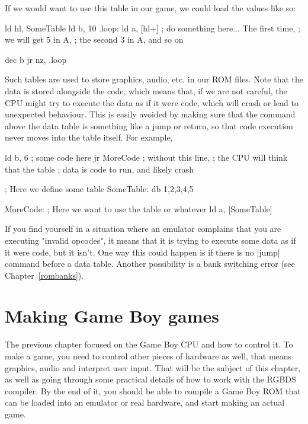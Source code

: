 \documentclass[11pt]{book}
\begin{document}
If we would want to use this table in our game, we could load the values like so:

\begin{code}
ld hl, SomeTable
ld b, 10
.loop:
    ld a, [hl+]
    ; do something here... The first time, 
    ; we will get 5 in A, 
    ; the second 3 in A, and so on
    
    dec b
    jr nz, .loop
\end{code}

Such tables are used to store graphics, audio, etc. in our ROM files. Note that the data is stored alongside the code, which means that, if we are not careful, the CPU might try to execute the data as if it were code, which will crash or lead to unexpected behaviour. This is easily avoided by making sure that the command above the data table is something like a jump or return, so that code execution never moves into the table itself. For example, 

\begin{code}
    ld b, 6 ; some code here
    jr MoreCode ; without this line, 
    ; the CPU will think that the table
    ; data is code to run, and likely crash 

; Here we define some table 
SomeTable:
    db 1,2,3,4,5

MoreCode:
    ; Here we want to use the table or whatever 
    ld a, [SomeTable]
\end{code}

If you find yourself in a situation where an emulator complains that you are executing "invalid opcodes", it means that it is trying to execute some data as if it were code, but it isn't. One way this could happen is if there is no |jump| command before a data table. Another possibility is a bank switching error (see Chapter~\ref{rombanks}).

\chapter{Making Game Boy games}
\label{gbgames}
The previous chapter focused on the Game Boy CPU and how to control it. To make a game, you need to control other pieces of hardware as well, that means graphics, audio and interpret user input. That will be the subject of this chapter, as well as going through some practical details of how to work with the RGBDS compiler. By the end of it, you should be able to compile a Game Boy ROM that can be loaded into an emulator or real hardware, and start making an actual game.
\end{document}
